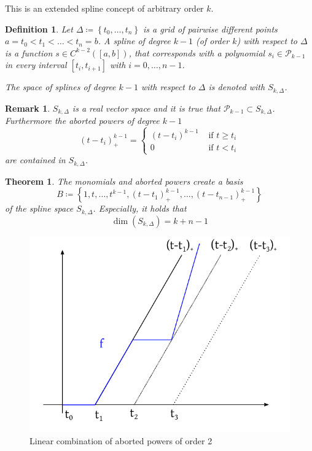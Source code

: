 \documentclass[a4paper]{article}
\newcounter{lecref}[section]
\numberwithin{lecref}{section}
\theoremstyle{break}
\newtheorem{thm}[lecref]{Theorem}
\newtheorem*{Definition}{Definition}
\newtheorem*{Remark}{Remark}
\newcommand{\Set}[1]{\left\{#1\right\}}
\begin{document}
This is an extended spline concept of arbitrary order $k$.

\begin{Definition}
  \label{definition:4-19}
  Let $\Delta \coloneqq \Set{t_0, \dots, t_n}$ is a grid of pairwise different points $a = t_0 < t_1 < \dots < t_n = b$.
  A spline of degree $k-1$ (of order $k$) with respect to $\Delta$ is a function $s \in C^{k-2}([a,b])$, that corresponds with a polynomial $s_i \in \mathcal P_{k-1}$ in every interval $[t_i, t_{i+1}]$ with $i = 0, \dots, n-1$.

  The space of splines of degree $k-1$ with respect to $\Delta$ is denoted with $S_{k, \Delta}$.
\end{Definition}

\begin{Remark}
  $S_{k,\Delta}$ is a real vector space and it is true that $\mathcal P_{k-1} \subset S_{k,\Delta}$.
  Furthermore the aborted powers of degree $k-1$
  \[
    (t - t_i)_+^{k-1} = \begin{cases}
      (t - t_i)^{k-1} & \text{ if } t \geq t_i \\
      0 & \text{ if } t < t_i
    \end{cases}
  \]
  are contained in $S_{k,\Delta}$.
\end{Remark}

\begin{thm}
  \label{theorem:4-20}
  The monomials and aborted powers create a basis
  \[ B \coloneqq \Set{1, t, \dots, t^{k-1}, (t - t_1)_+^{k-1}, \dots, (t - t_{n-1})_+^{k-1}} \]
  of the spline space $S_{k,\Delta}$. Especially, it holds that
  \[ \dim(S_{k,\Delta}) = k + n - 1 \]
\end{thm}

\begin{figure}[ht]
  \begin{center}
    \includegraphics{img/splines.pdf}
    \caption{Linear combination of aborted powers of order 2}
    \label{img:splines}
  \end{center}
\end{figure}
\end{document}
